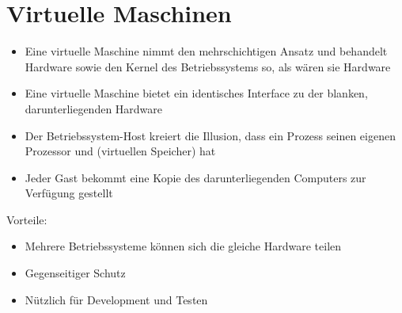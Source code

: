\documentclass[a4paper]{scrreprt}
\begin{document}
\section{Virtuelle Maschinen}
	\begin{itemize}
		\item Eine virtuelle Maschine nimmt den mehrschichtigen Ansatz und behandelt Hardware sowie den Kernel des Betriebssystems so, als wären sie Hardware
		\item Eine virtuelle Maschine bietet ein identisches Interface zu der blanken, darunterliegenden Hardware
		\item Der Betriebssystem-Host kreiert die Illusion, dass ein Prozess seinen eigenen Prozessor und (virtuellen Speicher) hat
		\item Jeder Gast bekommt eine Kopie des darunterliegenden Computers zur Verfügung gestellt
	\end{itemize}
	Vorteile:
		\begin{itemize}
			\item Mehrere Betriebssysteme können sich die gleiche Hardware teilen
			\item Gegenseitiger Schutz
			\item Nützlich für Development und Testen
		\end{itemize}
\end{document}
